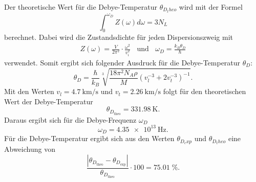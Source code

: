 Der theoretische Wert für die Debye-Temperatur $\theta_{D_theo}$ wird mit der Formel
\begin{equation}
  \int_{0}^{\omega_D} Z(\omega) d\omega = 3N_L
\end{equation}
berechnet. Dabei wird die Zustandsdichte für jeden Dispersionszweig mit
\begin{align}
  Z(\omega)= \frac{V}{2\pi^2}\cdot\frac{\omega^2}{v_i^2}\:\:\:\:\text{und}\:\:\:\:
  \omega_D=\frac{k_B \theta_D}{\hbar}
\end{align}
verwendet.
Somit ergibt sich folgender Ausdruck für die Debye-Temperatur $\theta_D$:
\begin{equation}
  \theta_D=\frac{\hbar}{k_B}\sqrt[3]{\frac{18\pi^2 N_A \rho}{M}(v_l^{-3}+2v_t^{-3})^{-1}}.
\end{equation}
Mit den Werten $v_l=\SI{4.7}{\km\per\s}$ und $v_t=\SI{2.26}{\km\per\s}$ folgt für
den theoretischen Wert der Debye-Temperatur
\begin{equation}
  \theta_{D_\text{theo}}=\SI{331.98}{\K}.
\end{equation}
Daraus ergibt sich für die Debye-Frequenz $\omega_D$
\begin{equation}
  \omega_D=\SI{4.35e13}{\Hz}.
\end{equation}
Für die Debye-Temperatur ergibt sich aus den Werten $\theta_{D_exp}$ und $\theta_{D_theo}$
eine Abweichung von
\begin{equation}
  \frac{|\theta_{D_\text{theo}}-\theta_{D_\text{exp}}|}{\theta_{D_\text{theo}}}\cdot 100=75.01\;\%.
\end{equation}
